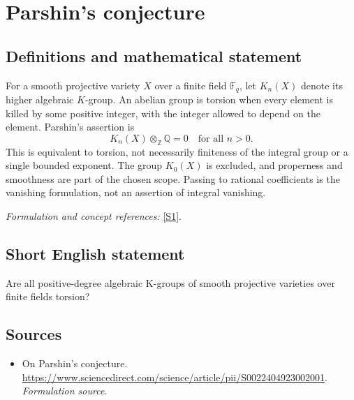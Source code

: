 \documentclass[11pt]{article}
\begin{document}
\section*{\texorpdfstring{Parshin's conjecture}{Parshin's conjecture}}\label{7200016}
\subsection{Definitions and mathematical statement}
For a smooth projective variety $X$ over a finite field ${\mathbb{F}}_q$, let $K_n(X)$ denote its higher algebraic $K$-group. An abelian group is torsion when every element is killed by some positive integer, with the integer allowed to depend on the element. Parshin's assertion is
\[
 K_n(X)\otimes_{{\mathbb{Z}}}{\mathbb{Q}}=0\quad\text{for all }n>0.
\]
This is equivalent to torsion, not necessarily finiteness of the integral group or a single bounded exponent. The group $K_0(X)$ is excluded, and properness and smoothness are part of the chosen scope. Passing to rational coefficients is the vanishing formulation, not an assertion of integral vanishing.
\par\smallskip\textit{Formulation and concept references:} \href{https://www.sciencedirect.com/science/article/pii/S0022404923002001}{[S1]}.

\subsection{Short English statement}
Are all positive-degree algebraic K-groups of smooth projective varieties over finite fields torsion?
\subsection{Sources}
\begin{itemize}
\item[S1]On Parshin's conjecture.
\url{https://www.sciencedirect.com/science/article/pii/S0022404923002001}.
\textit{Formulation source.}
\end{itemize}
\end{document}

